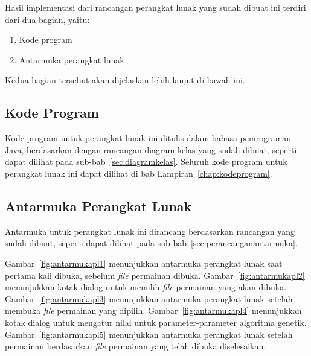 Hasil implementasi dari rancangan perangkat lunak yang sudah dibuat ini terdiri dari dua bagian, yaitu:

\begin{enumerate}
\item Kode program
\item Antarmuka perangkat lunak
\end{enumerate}

Kedua bagian tersebut akan dijelaskan lebih lanjut di bawah ini.

\subsection{Kode Program}
\label{sec:kodeprogram}

Kode program untuk perangkat lunak ini ditulis dalam bahasa pemrograman Java, berdasarkan dengan rancangan diagram kelas yang sudah dibuat, seperti dapat dilihat pada sub-bab~\ref{sec:diagramkelas}. Seluruh kode program untuk perangkat lunak ini dapat dilihat di bab Lampiran~\ref{chap:kodeprogram}.

\subsection{Antarmuka Perangkat Lunak}
\label{sec:antarmukapl}

Antarmuka untuk perangkat lunak ini dirancang berdasarkan rancangan yang sudah dibuat, seperti dapat dilihat pada sub-bab~\ref{sec:perancanganantarmuka}.

Gambar~\ref{fig:antarmukapl1} menunjukkan antarmuka perangkat lunak saat pertama kali dibuka, sebelum \textit{file} permainan dibuka. Gambar~\ref{fig:antarmukapl2} menunjukkan kotak dialog untuk memilih \textit{file} permainan yang akan dibuka. Gambar~\ref{fig:antarmukapl3} menunjukkan antarmuka perangkat lunak setelah membuka \textit{file} permainan yang dipilih. Gambar~\ref{fig:antarmukapl4} menunjukkan kotak dialog untuk mengatur nilai untuk parameter-parameter algoritma genetik. Gambar~\ref{fig:antarmukapl5} menunjukkan antarmuka perangkat lunak setelah permainan berdasarkan \textit{file} permainan yang telah dibuka diselesaikan.

